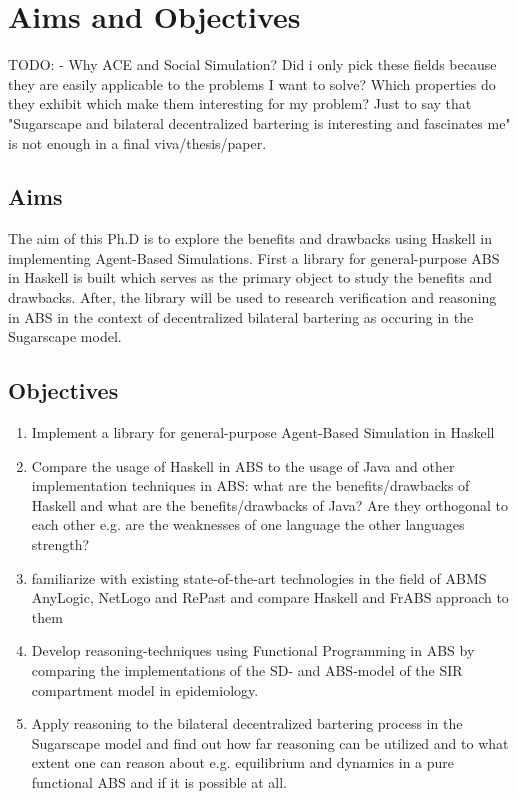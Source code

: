 \chapter{Aims and Objectives}
\label{chap:aimsObj}

TODO:
- Why ACE and Social Simulation? Did i only pick these fields because they are easily applicable to the problems I want to solve? Which properties do they exhibit which make them interesting for my problem? Just to say that "Sugarscape and bilateral decentralized bartering is interesting and fascinates me" is not enough in a final viva/thesis/paper.	

\section{Aims}
The aim of this Ph.D is to explore the benefits and drawbacks using Haskell in implementing Agent-Based Simulations. First a library for general-purpose ABS in Haskell is built which serves as the primary object to study the benefits and drawbacks. After, the library will be used to research verification and reasoning in ABS in the context of decentralized bilateral bartering as occuring in the Sugarscape model.

\section{Objectives}
\begin{enumerate}
	\item Implement a library for general-purpose Agent-Based Simulation in Haskell 
	\item Compare the usage of Haskell in ABS to the usage of Java and other implementation techniques in ABS: what are the benefits/drawbacks of Haskell and what are the benefits/drawbacks of Java? Are they orthogonal to each other e.g. are the weaknesses of one language the other languages strength?
	\item familiarize with existing state-of-the-art technologies in the field of ABMS AnyLogic, NetLogo and RePast and compare Haskell and FrABS approach to them
	\item Develop reasoning-techniques using Functional Programming in ABS by comparing the implementations of the SD- and ABS-model of the SIR compartment model in epidemiology.
	\item Apply reasoning to the bilateral decentralized bartering process in the Sugarscape model and find out how far reasoning can be utilized and to what extent one can reason about e.g. equilibrium and dynamics in a pure functional ABS and if it is possible at all.
\end{enumerate}

